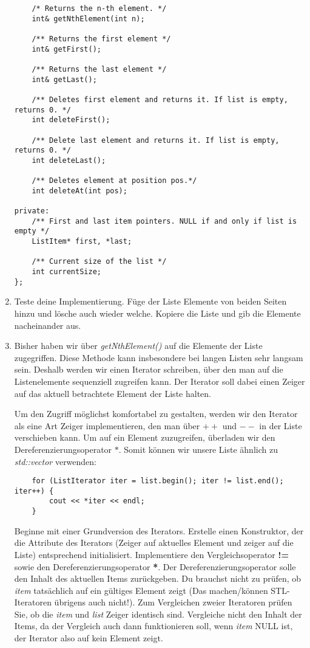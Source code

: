 \begin{enumerate}
\begin{lstlisting}
	/* Returns the n-th element. */
	int& getNthElement(int n);

	/** Returns the first element */
	int& getFirst();

	/** Returns the last element */
	int& getLast();

	/** Deletes first element and returns it. If list is empty, returns 0. */
	int deleteFirst();

	/** Delete last element and returns it. If list is empty, returns 0. */
	int deleteLast();
	
	/** Deletes element at position pos.*/
	int deleteAt(int pos);

private:
	/** First and last item pointers. NULL if and only if list is empty */
	ListItem* first, *last;
	
	/** Current size of the list */
	int currentSize;
};
\end{lstlisting}

\item
Teste deine Implementierung.
Füge der Liste Elemente von beiden Seiten hinzu und lösche auch wieder welche.
Kopiere die Liste und gib die Elemente nacheinander aus.

\item 
Bisher haben wir über \emph{getNthElement()} auf die Elemente der Liste zugegriffen.
Diese Methode kann insbesondere bei langen Listen sehr langsam sein.
Deshalb werden wir einen Iterator schreiben, über den man auf die Listenelemente sequenziell zugreifen kann.
Der Iterator soll dabei einen Zeiger auf das aktuell betrachtete Element der Liste halten.

Um den Zugriff möglichst komfortabel zu gestalten, werden wir den Iterator als eine Art Zeiger implementieren, den man über \textbf{$++$} und \textbf{$--$} in der Liste verschieben kann.
Um auf ein Element zuzugreifen, überladen wir den Dereferenzierungsoperator $*$.
Somit können wir unsere Liste ähnlich zu \emph{std::vector} verwenden:
\begin{lstlisting}
	for (ListIterator iter = list.begin(); iter != list.end(); iter++) {
		cout << *iter << endl;
	}
\end{lstlisting}

Beginne mit einer Grundversion des Iterators.
Erstelle einen Konstruktor, der die Attribute des Iterators (Zeiger auf aktuelles Element und zeiger auf die Liste) entsprechend initialisiert.
Implementiere den Vergleichsoperator \textbf{!=} sowie den Dereferenzierungsoperator \textbf{*}.
Der Dereferenzierungsoperator solle den Inhalt des aktuellen Items zurückgeben.
Du brauchst nicht zu prüfen, ob \emph{item} tatsächlich auf ein gültiges Element zeigt (Das machen/können STL-Iteratoren übrigens auch nicht!).
Zum Vergleichen zweier Iteratoren prüfen Sie, ob die \emph{item} und \emph{list} Zeiger identisch sind.
Vergleiche nicht den Inhalt der Items, da der Vergleich auch dann funktionieren soll, wenn \emph{item} NULL ist, der Iterator also auf kein Element zeigt.  \\


\end{enumerate}
